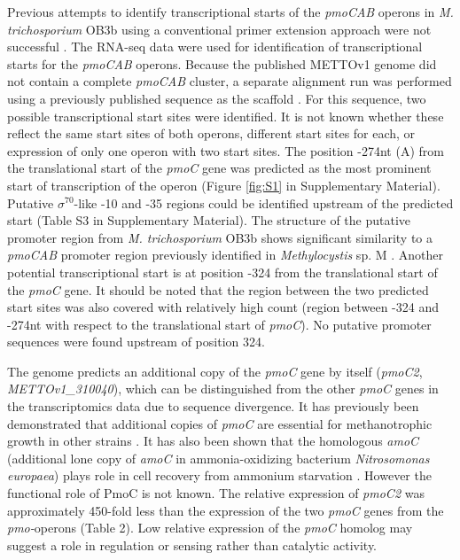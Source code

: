 Previous attempts to identify transcriptional starts of the \textit{pmoCAB} operons in \textit{M. trichosporium} OB3b using a conventional primer extension approach were not successful \cite{gilbert2000}.
The RNA-seq data were used for identification of transcriptional starts for the \textit{pmoCAB} operons.
Because the published METTOv1 genome did not contain a complete \textit{pmoCAB} cluster, a separate alignment run was performed using a previously published sequence as the scaffold \cite{holmes1995}.
For this sequence, two possible transcriptional start sites were identified.
It is not known whether these reflect the same start sites of both operons, different start sites for each, or expression of only one operon with two start sites.
The position -274nt (A) from the translational start of the \textit{pmoC} gene was predicted as the most prominent start of transcription of the operon (Figure \ref{fig:S1} in Supplementary Material).
Putative $\sigma^{70}$-like -10 and -35 regions could be identified upstream of the predicted start (Table S3 in Supplementary Material).
The structure of the putative promoter region from \textit{M. trichosporium} OB3b shows significant similarity to a \textit{pmoCAB} promoter region previously identified in \textit{Methylocystis} sp. M \cite{gilbert2000}.
Another potential transcriptional start is at position -324 from the translational start of the \textit{pmoC} gene.
It should be noted that the region between the two predicted start sites was also covered with relatively high count (region between -324 and -274nt with respect to the translational start of \textit{pmoC}).
No putative promoter sequences were found upstream of position 324.

The genome predicts an additional copy of the \textit{pmoC} gene by itself (\textit{pmoC2}, \textit{METTOv1\_310040}), which can be distinguished from the other \textit{pmoC} genes in the transcriptomics data due to sequence divergence.
It has previously been demonstrated that additional copies of \textit{pmoC} are essential for methanotrophic growth in other strains \cite{stolyar1999, dam2012a}.
It has also been shown that the homologous \textit{amoC} (additional lone copy of \textit{amoC} in ammonia-oxidizing bacterium \textit{Nitrosomonas europaea}) plays role in cell recovery from ammonium starvation \cite{berube2012}.
However the functional role of PmoC is not known.
The relative expression of \textit{pmoC2} was approximately 450-fold less than the expression of the two \textit{pmoC} genes from the \textit{pmo-}operons (Table 2).
Low relative expression of the \textit{pmoC} homolog may suggest a role in regulation or sensing rather than catalytic activity.

